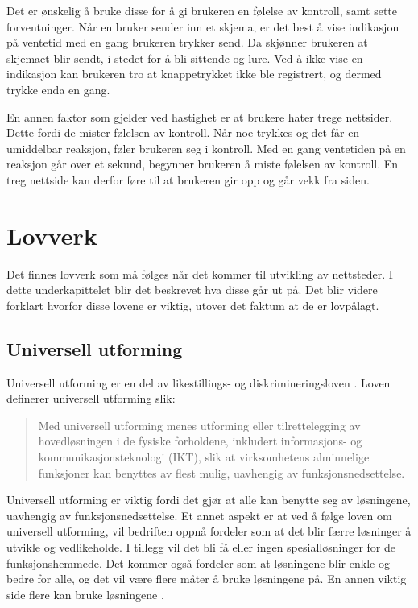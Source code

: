 Det er ønskelig å bruke disse for å gi brukeren en følelse av kontroll, samt sette forventninger. Når en bruker sender inn et skjema, er det best å vise indikasjon på ventetid med en gang brukeren trykker send. Da skjønner brukeren at skjemaet blir sendt, i stedet for å bli sittende og lure. Ved å ikke vise en indikasjon kan brukeren tro at knappetrykket ikke ble registrert, og dermed trykke enda en gang. 

En annen faktor som gjelder ved hastighet er at brukere hater trege nettsider. Dette fordi de mister følelsen av kontroll. Når noe trykkes og det får en umiddelbar reaksjon, føler brukeren seg i kontroll. Med en gang ventetiden på en reaksjon går over et sekund, begynner brukeren å miste følelsen av kontroll. En treg nettside kan derfor føre til at brukeren gir opp og går vekk fra siden.


\section{Lovverk}
Det finnes lovverk som må følges når det kommer til utvikling av nettsteder. I dette underkapittelet blir det beskrevet hva disse går ut på. Det blir videre forklart hvorfor disse lovene er viktig, utover det faktum at de er lovpålagt. 

\subsection{Universell utforming}
\label{sec:universal-design}
Universell utforming er en del av likestillings- og diskrimineringsloven \cite{lovdata2018fou}. Loven definerer universell utforming slik:

\begin{quote}
    Med universell utforming menes utforming eller tilrettelegging av hovedløsningen i de fysiske forholdene, inkludert informasjons- og kommunikasjonsteknologi (IKT), slik at virksomhetens alminnelige funksjoner kan benyttes av flest mulig, uavhengig av funksjonsnedsettelse.
\end{quote}

Universell utforming er viktig fordi det gjør at alle kan benytte seg av løsningene, uavhengig av funksjonsnedsettelse. Et annet aspekt er at ved å følge loven om universell utforming, vil bedriften oppnå fordeler som at det blir færre løsninger å utvikle og vedlikeholde. I tillegg vil det bli få eller ingen spesialløsninger for de funksjonshemmede. Det kommer også fordeler som at løsningene blir enkle og bedre for alle, og det vil være flere måter å bruke løsningene på. En annen viktig side flere kan bruke løsningene \cite{difi2018keu}.

